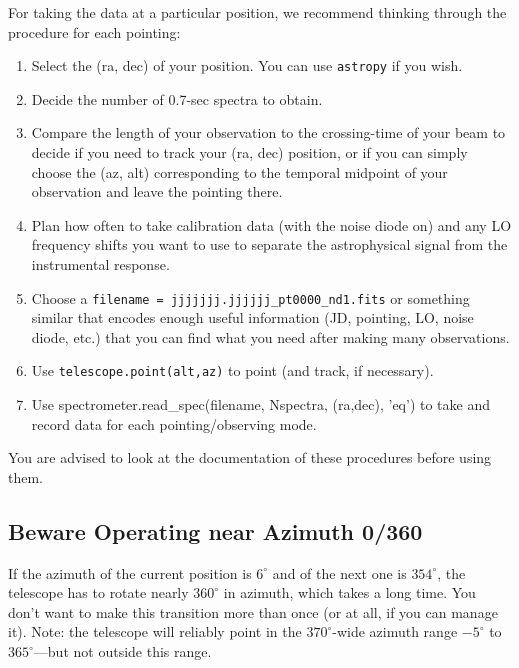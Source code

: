 \documentclass[psfig,preprint]{aastex}
\begin{document}
\noindent
For taking the data at a particular position, we recommend thinking
through the procedure for each pointing:
\begin{enumerate}

\item Select the (ra, dec) of your position. You can use {\tt astropy} if you wish.

\item Decide the number of 0.7-sec spectra to obtain.

\item Compare the length of your observation to the crossing-time of your
beam to decide if you need to track your (ra, dec) position, or if you can
simply choose the (az, alt) corresponding to the temporal midpoint of
your observation and leave the pointing there.

\item Plan how often to take calibration data (with the noise diode on) and
any LO frequency shifts you want to use to separate the astrophysical
signal from the instrumental response.

\item Choose a {\tt filename = jjjjjjj.jjjjjj\_pt0000\_nd1.fits} or something
similar that encodes enough useful information (JD, pointing, LO, noise diode,
etc.) that you can find what you need after making many observations.

\item Use {\tt telescope.point(alt,az)} to point (and track, if necessary).

\item Use spectrometer.read\_spec(filename, Nspectra, (ra,dec), 'eq') to take and record data for each pointing/observing mode.

\end{enumerate}

\noindent You are advised to look at the documentation of these procedures before using them.

\subsection{Beware Operating near Azimuth 0/360}

\noindent
If the azimuth of the current position is $6^\circ$ and of the next one
is $354^\circ$, the telescope has to rotate nearly $360^\circ$ in azimuth,
which takes a long time. You don't want to make this transition more
than once (or at all, if you can manage it). Note: the telescope will
reliably point in the $370^\circ$-wide azimuth range $-5^\circ$ to
$365^\circ$---but not outside this range.
\end{document}
